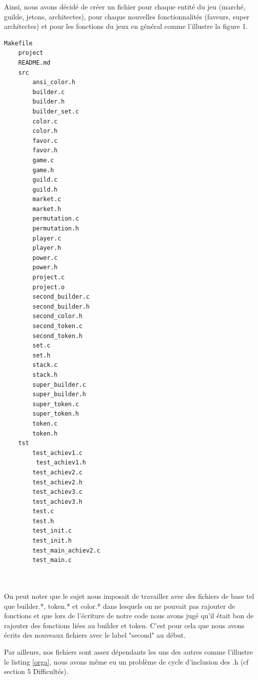 \documentclass{article}
\begin{document}
    \vspace{1em} Ainsi, nous avons décidé de créer un fichier pour chaque entité du jeu (marché, guilde, jetons, architectes), pour chaque nouvelles fonctionnalités (faveurs, super architectes) et pour les fonctions du jeux en général comme l'illustre la figure 1.
    
    \newpage




\begin{lstlisting}[frame=single, caption={Organisation et arborescence de nos fichiers},label=organisation]
    Makefile
    project
    README.md
    src
        ansi_color.h
        builder.c
        builder.h
        builder_set.c
        color.c
        color.h
        favor.c
        favor.h
        game.c
        game.h
        guild.c
        guild.h
        market.c
        market.h
        permutation.c
        permutation.h
        player.c
        player.h
        power.c
        power.h
        project.c
        project.o
        second_builder.c
        second_builder.h
        second_color.h
        second_token.c
        second_token.h
        set.c
        set.h
        stack.c
        stack.h
        super_builder.c
        super_builder.h
        super_token.c
        super_token.h
        token.c
        token.h
    tst
        test_achiev1.c
         test_achiev1.h
        test_achiev2.c
        test_achiev2.h
        test_achiev3.c
        test_achiev3.h
        test.c
        test.h
        test_init.c
        test_init.h
        test_main_achiev2.c
        test_main.c



\end{lstlisting}

        
    \vspace{3em} On peut noter que le sujet nous imposait de travailler avec des fichiers de base tel que builder.*, token.* et color.* dans lesquels on ne pouvait pas rajouter de fonctions et que lors de l'écriture de notre code nous avons jugé qu'il était bon de rajouter des fonctions liées au builder et token. C'est pour cela que nous avons écrits des nouveaux fichiers avec le label "second" au début.

    Par ailleurs, nos fichiers sont assez dépendants les uns des autres comme l'illustre le listing \ref{orga}, nous avons même eu un problème de cycle d'inclusion des .h (cf section 5 Difficultés). 
\end{document}
